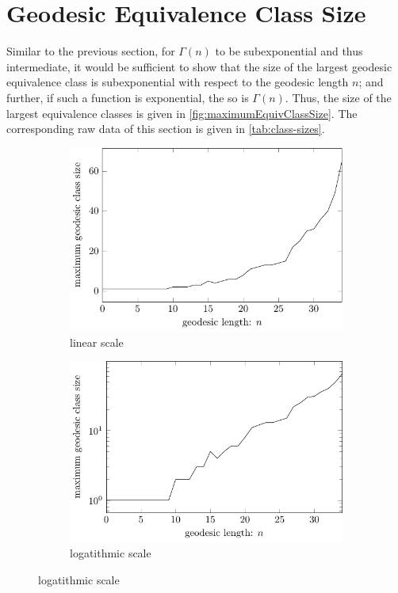 \newpage
\section{Geodesic Equivalence Class Size}

Similar to the previous section, for $\Gamma(n)$ to be subexponential and thus intermediate, it would be sufficient to show that the size of the largest geodesic equivalence class is subexponential with respect to the geodesic length $n$; and further, if such a function is exponential, the so is $\Gamma(n)$.
Thus, the size of the largest equivalence classes is given in \cref{fig:maximumEquivClassSize}.
The corresponding raw data of this section is given in \cref{tab:class-sizes}.

\begin{figure}[!h]
	\centering
	
	\begin{subfigure}{0.48\linewidth}
		\centering
		\includegraphics[width=\linewidth]
		{figures/results/maxClassSize/usual/maxClassSize}
		\caption{linear scale}
		\label{fig:maximumEquivClassSize:linear}
	\end{subfigure}
	\hfill
	\begin{subfigure}{0.48\linewidth}
		\centering
		\includegraphics[width=\linewidth]
		{figures/results/maxClassSize/log/maxClassSizeLog}
		\caption{logatithmic scale}
		\label{fig:maximumEquivClassSize:log}
	\end{subfigure}
	

\end{figure}
